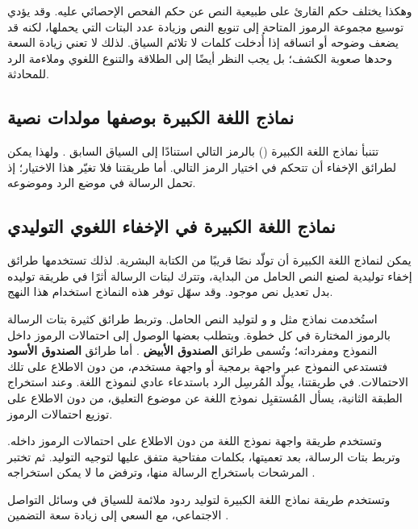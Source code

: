 وهكذا يختلف حكم القارئ على طبيعية النص عن حكم الفحص الإحصائي عليه. وقد يؤدي توسيع مجموعة الرموز المتاحة إلى تنويع النص وزيادة عدد البتات التي يحملها، لكنه قد يضعف وضوحه أو اتساقه إذا أُدخلت كلمات لا تلائم السياق. لذلك لا تعني زيادة السعة وحدها صعوبة الكشف؛ بل يجب النظر أيضًا إلى الطلاقة والتنوع اللغوي وملاءمة الرد للمحادثة.

\subsection{نماذج اللغة الكبيرة بوصفها مولدات نصية}
\label{sec:background-llm-generators}

تتنبأ نماذج اللغة الكبيرة () بالرمز التالي استنادًا إلى السياق السابق \cite{vaswani2017attention,kaptchuk2021meteor,radford2019language}.
ولهذا يمكن لطرائق الإخفاء أن تتحكم في اختيار الرمز التالي. أما طريقتنا فلا تغيّر هذا الاختيار؛ إذ تحمل الرسالة في موضع الرد وموضوعه.

\subsection{نماذج اللغة الكبيرة في الإخفاء اللغوي التوليدي}
\label{sec:background-llm-stego}

يمكن لنماذج اللغة الكبيرة أن تولّد نصًا قريبًا من الكتابة البشرية. لذلك تستخدمها طرائق إخفاء توليدية لصنع النص الحامل من البداية، وتترك لبتات الرسالة أثرًا في طريقة توليده بدل تعديل نص موجود. وقد سهّل توفر هذه النماذج استخدام هذا النهج.

استُخدمت نماذج مثل  \cite{radford2019language} و \cite{touvron2023llama2} و \cite{yang2023baichuan2} لتوليد النص الحامل.
وتربط طرائق كثيرة بتات الرسالة بالرموز المختارة في كل خطوة. ويتطلب بعضها الوصول إلى احتمالات الرموز داخل النموذج ومفرداته؛ وتُسمى طرائق \textbf{الصندوق الأبيض} \cite{wu2024generative}. أما طرائق \textbf{الصندوق الأسود} فتستدعي النموذج عبر واجهة برمجية أو واجهة مستخدم، من دون الاطلاع على تلك الاحتمالات.
في طريقتنا، يولّد المُرسِل الرد باستدعاء عادي لنموذج اللغة. وعند استخراج الطبقة الثانية، يسأل المُستقبِل نموذج اللغة عن موضوع التعليق، من دون الاطلاع على توزيع احتمالات الرموز.

وتستخدم طريقة  \cite{wu2024generative} واجهة نموذج اللغة من دون الاطلاع على احتمالات الرموز داخله. وتربط بتات الرسالة، بعد تعميتها، بكلمات مفتاحية متفق عليها لتوجيه التوليد. ثم تختبر المرشحات باستخراج الرسالة منها، وترفض ما لا يمكن استخراجه \cite{wu2024generative}.

وتستخدم طريقة  نماذج اللغة الكبيرة لتوليد ردود ملائمة للسياق في وسائل التواصل الاجتماعي، مع السعي إلى زيادة سعة التضمين \cite{liao2024co}.


